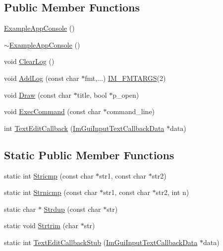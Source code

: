 \subsection*{Public Member Functions}
\begin{DoxyCompactItemize}
\item 
\mbox{\hyperlink{struct_example_app_console_a405521e6aa8f97954b67315baf8d6147}{Example\+App\+Console}} ()
\item 
\mbox{\hyperlink{struct_example_app_console_a91ef200056f867cf97a57db91bb991c4}{$\sim$\+Example\+App\+Console}} ()
\item 
void \mbox{\hyperlink{struct_example_app_console_a2ef13f00c474b16b8da2ec062d5e5cc2}{Clear\+Log}} ()
\item 
void \mbox{\hyperlink{struct_example_app_console_a719354ce6be7481923a5fd702e785952}{Add\+Log}} (const char $\ast$fmt,...) \mbox{\hyperlink{imgui_8h_a1251c2f9ddac0873dbad8181bd82c9f1}{I\+M\+\_\+\+F\+M\+T\+A\+R\+GS}}(2)
\item 
void \mbox{\hyperlink{struct_example_app_console_a0518a09c7e8648dd52c7c06df19ac17a}{Draw}} (const char $\ast$title, bool $\ast$p\+\_\+open)
\item 
void \mbox{\hyperlink{struct_example_app_console_aa1e8bf1f3795cbc41597e1ff081c6589}{Exec\+Command}} (const char $\ast$command\+\_\+line)
\item 
int \mbox{\hyperlink{struct_example_app_console_a0bc85c5dd2bef56ae1a64697be00ec87}{Text\+Edit\+Callback}} (\mbox{\hyperlink{struct_im_gui_input_text_callback_data}{Im\+Gui\+Input\+Text\+Callback\+Data}} $\ast$data)
\end{DoxyCompactItemize}
\subsection*{Static Public Member Functions}
\begin{DoxyCompactItemize}
\item 
static int \mbox{\hyperlink{struct_example_app_console_a6e5e5d66e77618eff0f89785261c9391}{Stricmp}} (const char $\ast$str1, const char $\ast$str2)
\item 
static int \mbox{\hyperlink{struct_example_app_console_a11bcb7a4b801e5eeb0c098c082fedc25}{Strnicmp}} (const char $\ast$str1, const char $\ast$str2, int n)
\item 
static char $\ast$ \mbox{\hyperlink{struct_example_app_console_a61d0da41ef31ea8690b23681a1e54dba}{Strdup}} (const char $\ast$str)
\item 
static void \mbox{\hyperlink{struct_example_app_console_af9a1afa791f9bd14701bed396b09de1c}{Strtrim}} (char $\ast$str)
\item 
static int \mbox{\hyperlink{struct_example_app_console_a394debe3cbf3cfd93b9bfd2835a4fdec}{Text\+Edit\+Callback\+Stub}} (\mbox{\hyperlink{struct_im_gui_input_text_callback_data}{Im\+Gui\+Input\+Text\+Callback\+Data}} $\ast$data)
\end{DoxyCompactItemize}
